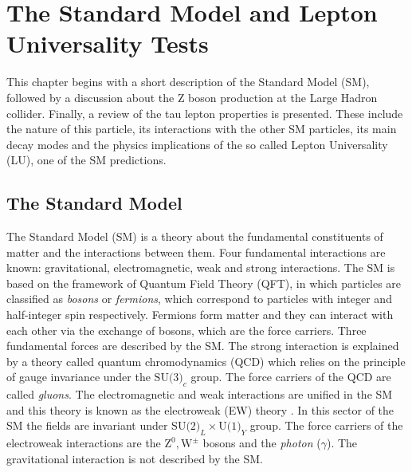 \chapter{The Standard Model and Lepton Universality Tests}\label{chap2}
This chapter begins with a short description of the Standard Model (SM), followed by a discussion about the Z boson production at the Large Hadron collider. Finally, a review of the tau lepton properties is presented. These include the nature of this particle, its interactions with the other SM particles, its main decay modes and the physics implications of the so called Lepton Universality (LU), one of the SM predictions.  
\section{The Standard Model}\label{chap2secm1}
The Standard Model (SM) is a theory about the fundamental constituents of matter and the interactions between them. Four fundamental interactions are known: gravitational, electromagnetic, weak and strong interactions. The SM is based on the framework of Quantum Field Theory (QFT), in which particles are classified as \textit{bosons} or \textit{fermions}, which correspond to particles with integer and half-integer spin respectively. Fermions form matter and they can interact with each other via the exchange of bosons, which are the force carriers. Three fundamental forces are described by the SM. The strong interaction is explained by a theory called quantum chromodynamics (QCD) \cite{GellMann:1964nj} which relies on the principle of gauge invariance under the $\text{SU(3)}_c$ group. The force carriers of the QCD are called \textit{gluons}. The electromagnetic and weak interactions are unified in the SM and this theory is known as the electroweak (EW) theory \cite{Glashow:1967rx,Salam:1968rm,Weinberg:1967tq}. In this sector of the SM the fields are invariant under $\text{SU(2)}_L\times\text{U(1)}_Y$ group. The force carriers of the electroweak interactions are the $\text{Z}^0,\text{W}^\pm$ bosons and the \textit{photon} ($\gamma$). The gravitational interaction is not described by the SM.
	
